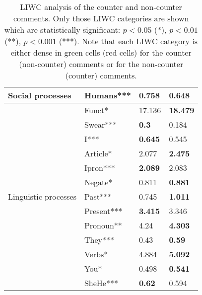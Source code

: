 \documentclass[11pt,a4paper]{article}
\begin{document}
{\begin{table}[!t]
{\begin{tabular}{| p{4.5cm} | p{2.2cm} | p{2cm} |p{2.2cm}|}
\hline


\multirow{ 1}{*}{Social processes}&Humans*** & \cellcolor{green}\textbf{0.758} & \cellcolor{red!20}0.648 \\

\hline


\multirow{13}{*}{Linguistic processes}&Funct* & \cellcolor{red!20}17.136 & \cellcolor{green}\textbf{18.479} \\
									&Swear*** & \cellcolor{green}\textbf{0.3} & \cellcolor{red!20}0.184 \\
                                    &I*** & \cellcolor{green}\textbf{0.645} & \cellcolor{red!20}0.545 \\
                                    &Article* & \cellcolor{red!20}2.077 & \cellcolor{green}\textbf{2.475} \\
                                    &Ipron*** & \cellcolor{green}\textbf{2.089} & \cellcolor{red!20}2.083 \\
                                    &Negate* & \cellcolor{red!20}0.811 & \cellcolor{green}\textbf{0.881} \\
                                    &Past*** & \cellcolor{red!20}0.745 & \cellcolor{green}\textbf{1.011} \\
                                    &Present*** & \cellcolor{green}\textbf{3.415} & \cellcolor{red!20}3.346 \\
                                    &Pronoun** & \cellcolor{red!20}4.24 & \cellcolor{green}\textbf{4.303} \\
                                    &They*** & \cellcolor{red!20}0.43 & \cellcolor{green}\textbf{0.59} \\
                                  	&Verbs* & \cellcolor{red!20}4.884 & \cellcolor{green}\textbf{5.092} \\
                                  	&You* & \cellcolor{red!20}0.498 & \cellcolor{green}\textbf{0.541} \\
                                    &SheHe*** & \cellcolor{green}\textbf{0.62} & \cellcolor{red!20}0.594 \\

			\hline
\end{tabular}}
\caption{LIWC analysis of the counter and non-counter comments. Only those LIWC categories are shown which are statistically significant: $p < 0.05$ (*), $p < 0.01$ (**), $p < 0.001$ (***). Note that each LIWC category is either dense in green cells (red cells) for the counter (non-counter) comments or for the non-counter (counter) comments.}
~\label{tab:liwc_analysis}
\end{table}


}
\end{document}

